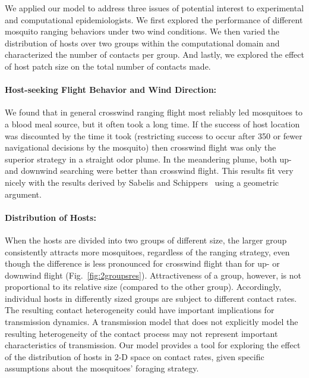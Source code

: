 \documentclass[12pt]{article}
\begin{document}
We applied our model to address three issues of potential
interest to experimental and computational epidemiologists. We
first explored the performance of different mosquito ranging
behaviors under two wind conditions. We then varied the
distribution of hosts over two groups within the computational
domain and characterized the number of contacts per group. And
lastly, we explored the effect of host patch size on the total
number of contacts made.

\paragraph{Host-seeking Flight Behavior and Wind Direction: }
We found that in general crosswind ranging flight most reliably led mosquitoes to a blood meal source, but it often took a long time. If the success of host location was discounted by the time it took (restricting success to occur after 350 or fewer navigational decisions by the mosquito) then crosswind flight was only the superior strategy in a straight odor plume. In the meandering plume, both up- and downwind searching were better than crosswind flight. This results fit very nicely with the results derived by Sabelis and Schippers~\cite{Sabelis1984} using a geometric argument.
%
\paragraph{Distribution of Hosts:} When the hosts are divided into two groups of different
size, the larger group consistently attracts more mosquitoes,
regardless of the ranging strategy, even though the difference
is less pronounced for crosswind flight than for up- or
downwind flight (Fig.~\ref{fig:2groupsres}).  Attractiveness
of a group, however, is not proportional to its relative size
(compared to the other group). Accordingly, individual hosts in
differently sized groups are subject to different contact rates.
The resulting contact heterogeneity could have important
implications for transmission dynamics. A transmission model
that does not explicitly model the resulting heterogeneity of
the contact process may not represent important characteristics
of transmission. Our model provides a tool for exploring the
effect of the distribution of hosts in 2-D space on contact
rates, given specific assumptions about the mosquitoes'
foraging strategy.
%
\end{document}
